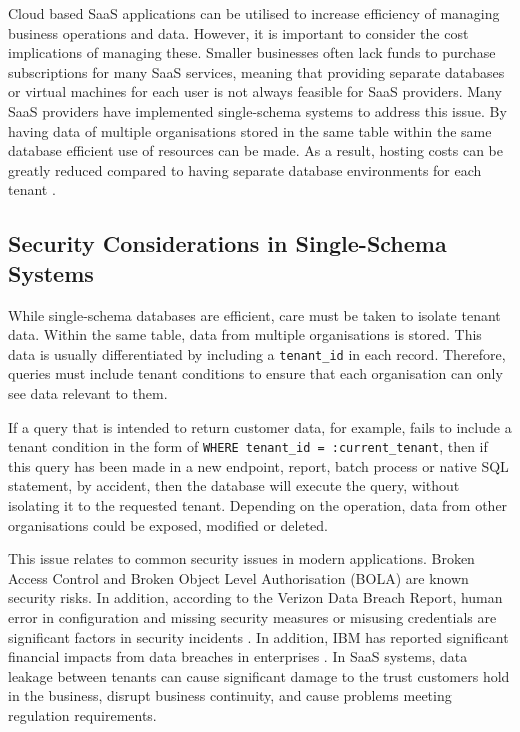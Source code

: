 \documentclass[conference]{IEEEtran}
\begin{document}
Cloud based SaaS applications can be utilised to increase efficiency of managing business operations and data. However, it is important to consider the cost implications of managing these. Smaller businesses often lack funds to purchase subscriptions for many SaaS services, meaning that providing separate databases or virtual machines for each user is not always feasible for SaaS providers. Many SaaS providers have implemented single-schema systems to address this issue. By having data of multiple organisations stored in the same table within the same database \cite{chong2006, aulbach2008, armbrust2010} efficient use of resources can be made. As a result, hosting costs can be greatly reduced compared to having separate database environments for each tenant \cite{kabbedijk2015}.

\subsection{Security Considerations in Single-Schema Systems}
While single-schema databases are efficient, care must be taken to isolate tenant data. Within the same table, data from multiple organisations is stored. This data is usually differentiated by including a \texttt{tenant\_id} in each record. Therefore, queries must include tenant conditions to ensure that each organisation can only see data relevant to them.

If a query that is intended to return customer data, for example, fails to include a tenant condition in the form of \texttt{WHERE tenant\_id = :current\_tenant}, then if this query has been made in a new endpoint, report, batch process or native SQL statement, by accident, then the database will execute the query, without isolating it to the requested tenant. Depending on the operation, data from other organisations could be exposed, modified or deleted.

This issue relates to common security issues in modern applications. Broken Access Control and Broken Object Level Authorisation (BOLA) \cite{owasp2021, owaspapi2023} are known security risks. In addition, according to the Verizon Data Breach Report, human error in configuration and missing security measures or misusing credentials are significant factors in security incidents \cite{verizon2023}. In addition, IBM has reported significant financial impacts from data breaches in enterprises \cite{ibm2023}. In SaaS systems, data leakage between tenants can cause significant damage to the trust customers hold in the business, disrupt business continuity, and cause problems meeting regulation requirements.
\end{document}
